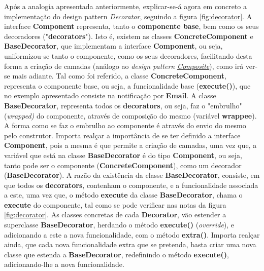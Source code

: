 Após a analogia apresentada anteriormente, explicar-se-á agora em concreto a implementação do design pattern \textit{Decorator}, seguindo a figura \ref{fig:decorator}. A interface \textbf{Component} representa, tanto o \textbf{componente base}, bem como os seus decoradores ("\textbf{decorators}"). Isto é, existem as classes \textbf{ConcreteComponent} e \textbf{BaseDecorator}, que implementam a interface \textbf{Component}, ou seja, uniformizou-se tanto o componente, como os seus decoradores, facilitando desta forma a criação de camadas (análogo ao  \textit{design pattern} \href{https://refactoring.guru/design-patterns/composite}{\textit{Composite}}), como irá ver-se mais adiante. Tal como foi referido, a classe \textbf{ConcreteComponent}, representa o componente base, ou seja, a funcionalidade base (\textbf{execute()}), que no exemplo apresentado consiste na notificação por \textbf{Email}. A classe \textbf{BaseDecorator}, representa todos os \textbf{decorators}, ou seja, faz o "embrulho" (\textit{wrapped)} do componente, através de composição do mesmo (variável \textbf{wrappee}). A forma como se faz o embrulho ao componente é através do envio do mesmo pelo construtor. Importa realçar a importância de se ter definido a interface \textbf{Component}, pois a mesma é que permite a criação de camadas, uma vez que, a variável que está na classe \textbf{BaseDecorator} é do tipo \textbf{Component}, ou seja, tanto pode ser o componente (\textbf{ConcreteComponent}), como um decorador (\textbf{BaseDecorator}). A razão da existência da classe \textbf{BaseDecorator}, consiste, em que todos os \textbf{decorators}, contenham o componente, e a funcionalidade associada a este, uma vez que, o método \textbf{execute} da classe \textbf{BaseDecorator}, chama o \textbf{execute} do componente, tal como se pode verificar nas notas da figura \ref{fig:decorator}. As classes concretas de cada \textbf{Decorator}, vão estender a superclasse \textbf{BaseDecorator}, herdando o método \textbf{execute()} (\textit{override}), e adicionando a este a nova funcionalidade, com o método \textbf{extra()}. Importa realçar ainda, que cada nova funcionalidade extra que se pretenda, basta criar uma nova classe que estenda a \textbf{BaseDecorator}, redefinindo o método \textbf{execute()}, adicionando-lhe a nova funcionalidade.


